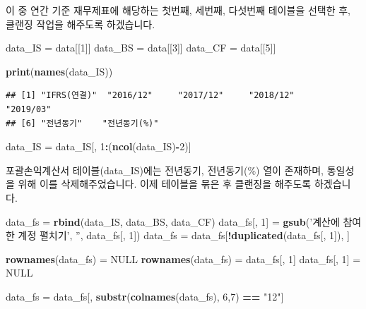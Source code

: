\documentclass[]{book}
\newenvironment{Shaded}{\begin{snugshade}}{\end{snugshade}}
\newcommand{\DecValTok}[1]{\textcolor[rgb]{0.00,0.00,0.81}{#1}}
\newcommand{\KeywordTok}[1]{\textcolor[rgb]{0.13,0.29,0.53}{\textbf{#1}}}
\newcommand{\NormalTok}[1]{#1}
\newcommand{\OperatorTok}[1]{\textcolor[rgb]{0.81,0.36,0.00}{\textbf{#1}}}
\newcommand{\OtherTok}[1]{\textcolor[rgb]{0.56,0.35,0.01}{#1}}
\newcommand{\StringTok}[1]{\textcolor[rgb]{0.31,0.60,0.02}{#1}}
\begin{document}
이 중 연간 기준 재무제표에 해당하는 첫번째, 세번째, 다섯번째 테이블을 선택한 후, 클랜징 작업을 해주도록 하겠습니다.

\begin{Shaded}
\begin{Highlighting}[]
\NormalTok{data_IS =}\StringTok{ }\NormalTok{data[[}\DecValTok{1}\NormalTok{]]}
\NormalTok{data_BS =}\StringTok{ }\NormalTok{data[[}\DecValTok{3}\NormalTok{]]}
\NormalTok{data_CF =}\StringTok{ }\NormalTok{data[[}\DecValTok{5}\NormalTok{]]}

\KeywordTok{print}\NormalTok{(}\KeywordTok{names}\NormalTok{(data_IS))}
\end{Highlighting}
\end{Shaded}

\begin{verbatim}
## [1] "IFRS(연결)"  "2016/12"     "2017/12"     "2018/12"     "2019/03"    
## [6] "전년동기"    "전년동기(%)"
\end{verbatim}

\begin{Shaded}
\begin{Highlighting}[]
\NormalTok{data_IS =}\StringTok{ }\NormalTok{data_IS[, }\DecValTok{1}\OperatorTok{:}\NormalTok{(}\KeywordTok{ncol}\NormalTok{(data_IS)}\OperatorTok{-}\DecValTok{2}\NormalTok{)]}
\end{Highlighting}
\end{Shaded}

포괄손익계산서 테이블(data\_IS)에는 전년동기, 전년동기(\%) 열이 존재하며, 통일성을 위해 이를 삭제해주었습니다. 이제 테이블을 묶은 후 클랜징을 해주도록 하겠습니다.

\begin{Shaded}
\begin{Highlighting}[]
\NormalTok{data_fs =}\StringTok{ }\KeywordTok{rbind}\NormalTok{(data_IS, data_BS, data_CF)}
\NormalTok{data_fs[, }\DecValTok{1}\NormalTok{] =}\StringTok{ }\KeywordTok{gsub}\NormalTok{(}\StringTok{'계산에 참여한 계정 펼치기'}\NormalTok{,}
                    \StringTok{''}\NormalTok{, data_fs[, }\DecValTok{1}\NormalTok{])}
\NormalTok{data_fs =}\StringTok{ }\NormalTok{data_fs[}\OperatorTok{!}\KeywordTok{duplicated}\NormalTok{(data_fs[, }\DecValTok{1}\NormalTok{]), ]}

\KeywordTok{rownames}\NormalTok{(data_fs) =}\StringTok{ }\OtherTok{NULL}
\KeywordTok{rownames}\NormalTok{(data_fs) =}\StringTok{ }\NormalTok{data_fs[, }\DecValTok{1}\NormalTok{]}
\NormalTok{data_fs[, }\DecValTok{1}\NormalTok{] =}\StringTok{ }\OtherTok{NULL}

\NormalTok{data_fs =}\StringTok{ }\NormalTok{data_fs[, }\KeywordTok{substr}\NormalTok{(}\KeywordTok{colnames}\NormalTok{(data_fs), }\DecValTok{6}\NormalTok{,}\DecValTok{7}\NormalTok{) }\OperatorTok{==}\StringTok{ "12"}\NormalTok{]}
\end{Highlighting}
\end{Shaded}
\end{document}
